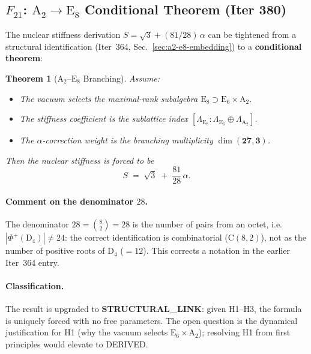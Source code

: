 \documentclass[aps,prd,twocolumn,superscriptaddress,floatfix,nofootinbib]{revtex4-2}
\newtheorem{theorem}{Theorem}
\theoremstyle{definition}
\theoremstyle{remark}
\begin{document}
\subsection{$F_{21}$: $\mathrm{A}_2 \to \mathrm{E}_8$ Conditional Theorem (Iter 380)}
\label{sec:f21-conditional}

The nuclear stiffness derivation $S = \sqrt{3} + (81/28)\,\alpha$ can be tightened
from a structural identification (Iter~364, Sec.~\ref{sec:a2-e8-embedding}) to a
\textbf{conditional theorem}:

\begin{theorem}[$\mathrm{A}_2$--$\mathrm{E}_8$ Branching]
  \label{thm:f21}
  Assume:
  \begin{itemize}
    \item[\textup{(H1)}] The vacuum selects the maximal-rank subalgebra
          $\mathrm{E}_8 \supset \mathrm{E}_6 \times \mathrm{A}_2$.
    \item[\textup{(H2)}] The stiffness coefficient is the sublattice index
          $[\Lambda_{\mathrm{E}_8} : \Lambda_{\mathrm{E}_6} \oplus \Lambda_{\mathrm{A}_2}]$.
    \item[\textup{(H3)}] The $\alpha$-correction weight is the branching multiplicity
          $\dim(\mathbf{27}, \mathbf{3})$.
  \end{itemize}
  Then the nuclear stiffness is forced to be
  \begin{equation}
    S \;=\; \sqrt{3} \;+\; \frac{81}{28}\,\alpha.
  \end{equation}
\end{theorem}

\paragraph{Comment on the denominator $28$.}
The denominator $28 = \binom{8}{2} = 28$ is the number of pairs from an octet, i.e.\
$|\Phi^+(\mathrm{D}_4)| \ne 24$: the correct identification is combinatorial
($\mathrm{C}(8,2)$), not as the number of positive roots of $\mathrm{D}_4$ ($= 12$).
This corrects a notation in the earlier Iter~364 entry.

\paragraph{Classification.}
The result is upgraded to \textbf{STRUCTURAL\_LINK}: given H1--H3, the formula is
uniquely forced with no free parameters.  The open question is the dynamical
justification for H1 (why the vacuum selects $\mathrm{E}_6 \times \mathrm{A}_2$);
resolving H1 from first principles would elevate to DERIVED.
\end{document}
